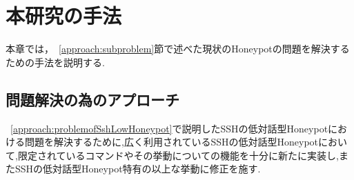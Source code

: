 \chapter{本研究の手法}
\label{method}

本章では，~\ref{approach:subproblem}節で述べた現状のHoneypotの問題を解決するための手法を説明する.

\section{問題解決の為のアプローチ}
\label{method:approach}
 ~\ref{approach:problemofSshLowHoneypot}で説明したSSHの低対話型Honeypotにおける問題を解決するために,広く利用されているSSHの低対話型Honeypotにおいて,限定されているコマンドやその挙動についての機能を十分に新たに実装し,またSSHの低対話型Honeypot特有の以上な挙動に修正を施す.

